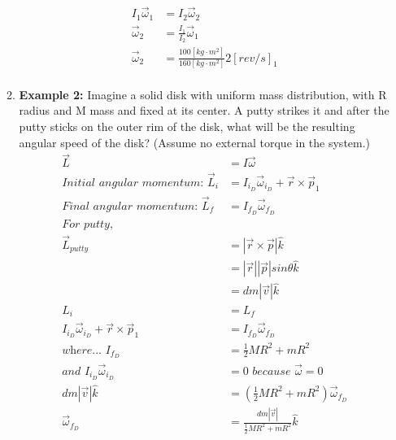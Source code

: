 \documentclass{article}
\begin{document}
\begin{enumerate}
\begin{enumerate}
\begin{align*}
                    I_1\vec{\omega}_1&=I_2\vec{\omega}_2 \\
                    \vec{\omega}_2&=\frac{I_1}{I_2}\vec{\omega}_1 \\
                    \vec{\omega}_2&=\frac{100[{kg}\cdot{m^2}]}{160[{kg}\cdot{m^2}]}{2[rev/s]}_1 \\
                \end{align*}
                \item \textbf{Example 2:}
                Imagine a solid disk with uniform mass distribution, with R radius and M mass and fixed at its center. A putty strikes it and after the putty sticks on the outer rim of the disk, what will be the resulting angular speed of the disk? (Assume no external torque in the system.)
                \begin{align*}
                    \vec{L}&=I\vec{\omega} \\
                    \textit{Initial angular momentum: }\vec{L}_i&=I_{i_D}\vec{\omega}_{i_D} + \vec{r}\times\vec{p}_1 \\
                    \textit{Final angular momentum: }\vec{L}_f&=I_{f_D}\vec{\omega}_{f_D} \\
                    \textit{For putty,} \\
                    \vec{L}_{putty}&=|\vec{r}\times\vec{p}|\hat{k} \\
                    &=|\vec{r}||\vec{p}|sin\theta\hat{k} \\
                    &=dm|\vec{v}|\hat{k} \\
                    L_i&=L_f \\
                    I_{i_D}\vec{\omega}_{i_D} + \vec{r}\times\vec{p}_1&=I_{f_D}\vec{\omega}_{f_D} \\
                    \textit{where... }I_{f_D}&=\frac{1}{2}MR^2+mR^2 \\
                    \textit{and } I_{i_D}\vec{\omega}_{i_D}&=0\textit{ because }\vec{\omega}=0\\
                    dm|\vec{v}|\hat{k}&=(\frac{1}{2}MR^2+mR^2)\vec{\omega}_{f_D} \\
                    \vec{\omega}_{f_D}&=\frac{dm|\vec{v}|}{\frac{1}{2}MR^2+mR^2}\hat{k} \\

\end{align*}
\end{enumerate}
\end{enumerate}
\end{document}

